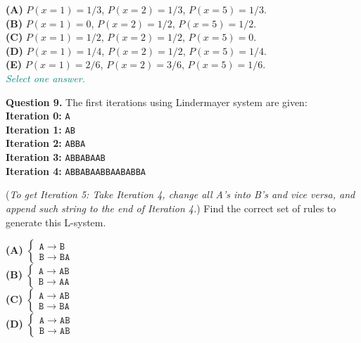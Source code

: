 \documentclass[jou]{apa6}
\begin{document}
{\bf (A)} $P(x = 1) = 1/3$, $P(x = 2) = 1/3$, $P(x = 5) = 1/3$.\\
{\bf (B)} $P(x = 1) = 0$, $P(x = 2) = 1/2$, $P(x = 5) = 1/2$.\\
{\bf (C)} $P(x = 1) = 1/2$, $P(x = 2) = 1/2$, $P(x = 5) = 0$.\\
{\bf (D)} $P(x = 1) = 1/4$, $P(x = 2) = 1/2$, $P(x = 5) = 1/4$.\\
{\bf (E)} $P(x = 1) = 2/6$, $P(x = 2) = 3/6$, $P(x = 5) = 1/6$.\\
\textcolor{teal}{\em Select one answer.}


\vspace{10pt}
{\bf Question 9.} The first iterations using Lindermayer system are given:\\
{\bf Iteration 0:} {\tt A}\\
{\bf Iteration 1:} {\tt AB}\\
{\bf Iteration 2:} {\tt ABBA}\\
{\bf Iteration 3:} {\tt ABBABAAB}\\
{\bf Iteration 4:} {\tt ABBABAABBAABABBA}

({\em To get Iteration 5: Take Iteration 4, 
change all A's into B's and
vice versa, and append such string to the end of Iteration 4.})
Find the correct set of rules to generate this L-system. 

{\bf (A)} ${\displaystyle \left\{ \begin{array}{l}
\mathtt{A} \rightarrow \mathtt{B}\\
\mathtt{B} \rightarrow \mathtt{BA}
\end{array} \right. }$\\
{\bf (B)} ${\displaystyle \left\{ \begin{array}{l}
\mathtt{A} \rightarrow \mathtt{AB}\\
\mathtt{B} \rightarrow \mathtt{AA}
\end{array} \right. }$\\
{\bf (C)} ${\displaystyle \left\{ \begin{array}{l}
\mathtt{A} \rightarrow \mathtt{AB}\\
\mathtt{B} \rightarrow \mathtt{BA}
\end{array} \right. }$\\
{\bf (D)} ${\displaystyle \left\{ \begin{array}{l}
\mathtt{A} \rightarrow \mathtt{AB}\\
\mathtt{B} \rightarrow \mathtt{AB}
\end{array} \right. }$
\end{document}
